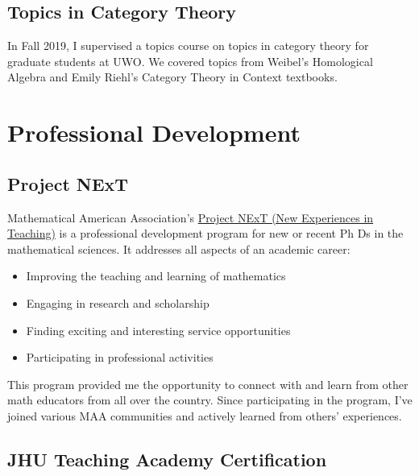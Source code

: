 \documentclass[
]{report}
\providecommand{\tightlist}{%
  \setlength{\itemsep}{0pt}\setlength{\parskip}{0pt}}
\begin{document}
\hypertarget{topics-in-category-theory}{%
\section{Topics in Category Theory}\label{topics-in-category-theory}}

In Fall 2019, I supervised a topics course on topics in category theory for graduate students at UWO.
We covered topics from Weibel's Homological Algebra and Emily Riehl's Category Theory in Context textbooks.

\hypertarget{professional-development-1}{%
\chapter{Professional Development}\label{professional-development-1}}

\hypertarget{project-next}{%
\section{Project NExT}\label{project-next}}

Mathematical American Association's \href{https://www.maa.org/programs-and-communities/professional-development/project-next}{Project NExT (New Experiences in Teaching)} is a professional development program for new or recent Ph Ds in the mathematical sciences. It addresses all aspects of an academic career:

\begin{itemize}
\tightlist
\item
  Improving the teaching and learning of mathematics
\item
  Engaging in research and scholarship
\item
  Finding exciting and interesting service opportunities
\item
  Participating in professional activities
\end{itemize}

This program provided me the opportunity to connect with and learn from other math educators from all over the country.
Since participating in the program, I've joined various MAA communities and actively learned from others' experiences.

\hypertarget{jhu-teaching-academy-certification}{%
\section{JHU Teaching Academy Certification}\label{jhu-teaching-academy-certification}}
\end{document}
